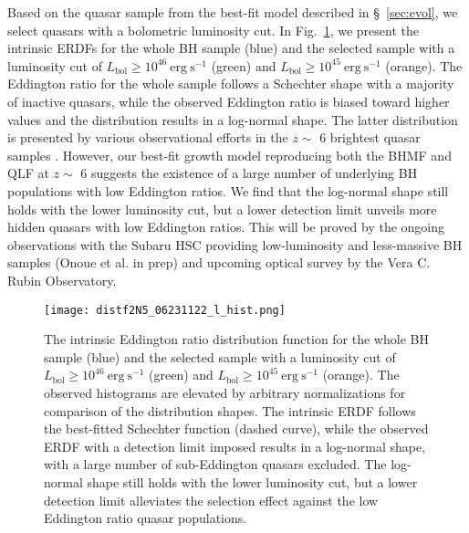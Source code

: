 \documentclass[twocolumn, twocolappendix]{aastex63}
\newcommand{\Lbol}{L_\mathrm{bol}}
\begin{document}
\begin{CJK*}{UTF8}{gbsn}
Based on the quasar sample from the best-fit model described in \S~\ref{sec:evol}, 
we select quasars with a bolometric luminosity cut.
In Fig.~\ref{fig:lhist}, we present the intrinsic ERDFs for the whole BH sample (blue) and the selected sample with
a luminosity cut of $\Lbol \geq 10^{46}~\mathrm{erg~s^{-1}}$ (green) and $\Lbol \geq 10^{45}~\mathrm{erg~s^{-1}}$ (orange).  
The Eddington ratio for the whole sample follows a Schechter shape with a majority of inactive quasars, 
while the observed Eddington ratio is biased toward higher values and the distribution results in a log-normal shape. 
The latter distribution is presented by various observational efforts in the $z\sim$ 6 brightest quasar samples 
\citep[e.g.,][]{2010AJ....140..546W,2019ApJ...873...35S,2022arXiv220705113F}.
However, our best-fit growth model reproducing both the BHMF and QLF at $z\sim$ 6 suggests the existence of
a large number of underlying BH populations with low Eddington ratios. 
We find that the log-normal shape still holds with the lower luminosity cut, 
but a lower detection limit unveils more hidden quasars with low Eddington ratios. 
This will be proved by the ongoing observations with the Subaru HSC providing low-luminosity and less-massive BH samples
(Onoue et al. in prep) and upcoming optical survey by the Vera C. Rubin Observatory.



\begin{figure}
\centering
\texttt{[image: distf2N5\_06231122\_l\_hist.png]}
\caption{
The intrinsic Eddington ratio distribution function for the whole BH sample (blue) and the selected sample with
a luminosity cut of $\Lbol \geq 10^{46}~\mathrm{erg~s^{-1}}$ (green) and $\Lbol \geq 10^{45}~\mathrm{erg~s^{-1}}$ (orange).  
The observed histograms are elevated by arbitrary normalizations for comparison of the distribution shapes.
The intrinsic ERDF follows the best-fitted Schechter function (dashed curve), 
while the observed ERDF with a detection limit imposed results in a log-normal shape, 
with a large number of sub-Eddington quasars excluded.
The log-normal shape still holds with the lower luminosity cut, 
but a lower detection limit alleviates the selection effect against the low Eddington ratio quasar populations.
}
\label{fig:lhist}
\end{figure}
  



\end{CJK*}
\end{document}
